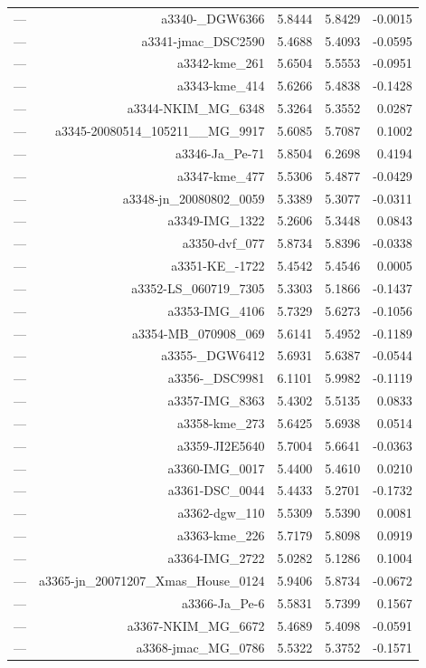 \begin{table}[htbp]
\begin{tabular}{lrrrr}
— & a3340-_DGW6366 & 5.8444 & 5.8429 & -0.0015 \\
— & a3341-jmac_DSC2590 & 5.4688 & 5.4093 & -0.0595 \\
— & a3342-kme_261 & 5.6504 & 5.5553 & -0.0951 \\
— & a3343-kme_414 & 5.6266 & 5.4838 & -0.1428 \\
— & a3344-NKIM_MG_6348 & 5.3264 & 5.3552 & 0.0287 \\
— & a3345-20080514_105211__MG_9917 & 5.6085 & 5.7087 & 0.1002 \\
— & a3346-Ja_Pe-71 & 5.8504 & 6.2698 & 0.4194 \\
— & a3347-kme_477 & 5.5306 & 5.4877 & -0.0429 \\
— & a3348-jn_20080802_0059 & 5.3389 & 5.3077 & -0.0311 \\
— & a3349-IMG_1322 & 5.2606 & 5.3448 & 0.0843 \\
— & a3350-dvf_077 & 5.8734 & 5.8396 & -0.0338 \\
— & a3351-KE_-1722 & 5.4542 & 5.4546 & 0.0005 \\
— & a3352-LS_060719_7305 & 5.3303 & 5.1866 & -0.1437 \\
— & a3353-IMG_4106 & 5.7329 & 5.6273 & -0.1056 \\
— & a3354-MB_070908_069 & 5.6141 & 5.4952 & -0.1189 \\
— & a3355-_DGW6412 & 5.6931 & 5.6387 & -0.0544 \\
— & a3356-_DSC9981 & 6.1101 & 5.9982 & -0.1119 \\
— & a3357-IMG_8363 & 5.4302 & 5.5135 & 0.0833 \\
— & a3358-kme_273 & 5.6425 & 5.6938 & 0.0514 \\
— & a3359-JI2E5640 & 5.7004 & 5.6641 & -0.0363 \\
— & a3360-IMG_0017 & 5.4400 & 5.4610 & 0.0210 \\
— & a3361-DSC_0044 & 5.4433 & 5.2701 & -0.1732 \\
— & a3362-dgw_110 & 5.5309 & 5.5390 & 0.0081 \\
— & a3363-kme_226 & 5.7179 & 5.8098 & 0.0919 \\
— & a3364-IMG_2722 & 5.0282 & 5.1286 & 0.1004 \\
— & a3365-jn_20071207_Xmas_House_0124 & 5.9406 & 5.8734 & -0.0672 \\
— & a3366-Ja_Pe-6 & 5.5831 & 5.7399 & 0.1567 \\
— & a3367-NKIM_MG_6672 & 5.4689 & 5.4098 & -0.0591 \\
— & a3368-jmac_MG_0786 & 5.5322 & 5.3752 & -0.1571 \\

\end{tabular}
\end{table}
